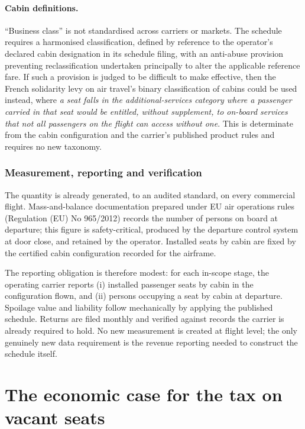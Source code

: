 \documentclass[../../main]{subfiles}
\begin{document}
\paragraph{Cabin definitions.} ``Business class'' is not standardised across carriers or markets. The schedule requires a harmonised classification, defined by reference to the operator's declared cabin designation in its schedule filing, with an anti-abuse provision preventing reclassification undertaken principally to alter the applicable reference fare. If such a provision is judged to be difficult to make effective, then the French solidarity levy on air travel's binary classification of cabins could be used instead, where \textit{a seat falls in the additional-services category where a passenger carried in that seat would be entitled, without supplement, to on-board services that not all passengers on the flight can access without one}. This is determinate from the cabin configuration and the carrier's published product rules and requires no new taxonomy.

\subsubsection{Measurement, reporting and verification}
The quantity is already generated, to an audited standard, on every commercial flight. Mass-and-balance documentation prepared under EU air operations rules (Regulation (EU) No 965/2012) records the number of persons on board at departure; this figure is safety-critical, produced by the departure control system at door close, and retained by the operator. Installed seats by cabin are fixed by the certified cabin configuration recorded for the airframe.

The reporting obligation is therefore modest: for each in-scope stage, the operating carrier reports (i) installed passenger seats by cabin in the configuration flown, and (ii) persons occupying a seat by cabin at departure. Spoilage value and liability follow mechanically by applying the published schedule. Returns are filed monthly and verified against records the carrier is already required to hold. No new measurement is created at flight level; the only genuinely new data requirement is the revenue reporting needed to construct the schedule itself.

\section{The economic case for the tax on vacant seats}
\end{document}
